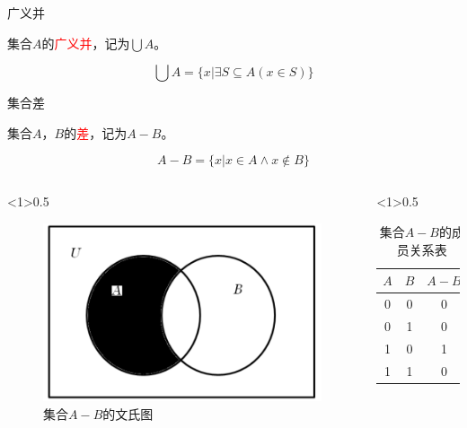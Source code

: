 \documentclass[xetex,10pt,aspectratio=43]{beamer}
\begin{document}
	\begin{frame}{广义并}
		
		集合$A$的\textcolor{red}{广义并}，记为$\bigcup A$。
		
		$$\bigcup A=\{x|\exists S\subseteq A(x\in S)\}$$
		
	\end{frame}

	\begin{frame}{集合差}
	
		集合$A$，$B$的\textcolor{red}{差}，记为$A-B$。
		
		$$A-B=\{x|x\in A\wedge x\notin B\}$$
		
		\begin{columns}
			
			\begin{column}<1>{0.5\textwidth}
				
				\begin{figure}
					
					\centering
					
					\includegraphics[scale=0.5]{7.png}
					
					\caption{集合$A-B$的文氏图}
					
				\end{figure}
				
			\end{column}
			
			\begin{column}<1>{0.5\textwidth}
				
				\begin{table}
					
					\centering
					
					\begin{tabular}{|c|c|c|}
						\hline
						$A$ & $B$ & $A-B$\\
						\hline
						0 & 0 & 0\\
						\hline
						0 & 1 & 0\\
						\hline
						1 & 0 & 1\\
						\hline
						1 & 1 & 0\\
						\hline
					\end{tabular}
					
					\caption{集合$A-B$的成员关系表}
					
				\end{table}
				
			\end{column}
			
		\end{columns}
		
	\end{frame}	
\end{document}
